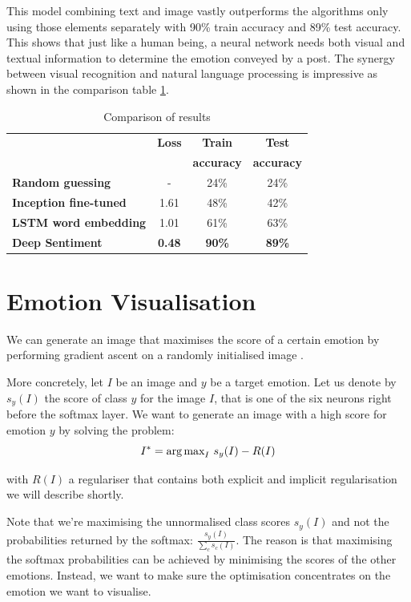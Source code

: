 This model combining text and image vastly outperforms the algorithms only using those elements separately with 90\% train accuracy and 89\% test accuracy. This shows that just like a human being, a neural network needs both visual and textual information to determine the emotion conveyed by a post. The synergy between visual recognition and natural language processing is impressive as shown in the comparison table \ref{all-results}.

\begin{table}[H]
\begin{center}
    \begin{tabular}{| l | c | c | c |}
    \hline
    & \textbf{Loss} & \textbf{Train} & \textbf{Test} \\
    & & \textbf{accuracy} & \textbf{accuracy} \\ \hline
    \textbf{Random guessing} & - & 24\% & 24\% \\ \hline
    \textbf{Inception fine-tuned}  & 1.61 & 48\% & 42\% \\ \hline
    \textbf{LSTM word embedding} & 1.01 & 61\% & 63\% \\ \hline
    \textbf{Deep Sentiment} & \textbf{0.48} & \textbf{90\%} & \textbf{89\%} \\
    \hline
    \end{tabular}
\end{center} 
\caption{Comparison of results}
\label{all-results}
\end{table}

\newpage
\section{Emotion Visualisation}
We can generate an image that maximises the score of a certain emotion by performing gradient ascent on a randomly initialised image \cite{class-vis}.

More concretely, let $I$ be an image and $y$ be a target emotion. Let us denote by $s_y(I)$ the score of class $y$ for the image $I$, that is one of the six neurons right before the softmax layer. We want to generate an image with a high score for emotion $y$ by solving the problem:
\begin{equation}
I^* = \text{arg\,max}_I ~s_y(I) - R(I)
\end{equation}

with $R(I)$ a regulariser that contains both explicit and implicit regularisation we will describe shortly.

Note that we're maximising the unnormalised class scores $s_y(I)$ and not the probabilities returned by the softmax: $\frac{s_y(I)}{\sum_c s_c(I)}$. The reason is that maximising the softmax probabilities can be achieved by minimising the scores of the other emotions. Instead, we want to make sure the optimisation concentrates on the emotion we want to visualise. 

